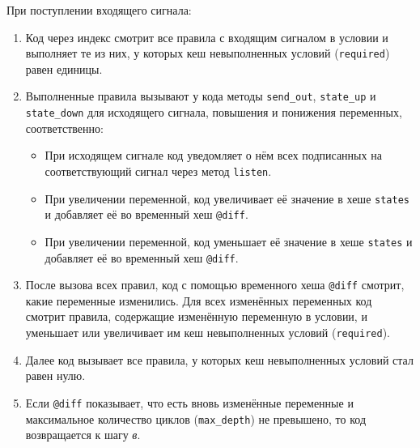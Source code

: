 \documentclass[utf8,a5paper,portrait,10pt]{eskdtext}
\begin{document}
При поступлении входящего сигнала:
\begin{enumerate}
  \item Код через индекс смотрит все правила с входящим сигналом в условии и
        выполняет те из них, у которых кеш невыполненных условий
        (\texttt{required}) равен единицы.
  \item Выполненные правила вызывают у кода методы \texttt{send\_out},
        \texttt{state\_up} и \texttt{state\_down} для исходящего сигнала,
        повышения и понижения переменных, соответственно:
        \begin{itemize}
          \item При исходящем сигнале код уведомляет о нём всех подписанных
                на соответствующий сигнал через метод \texttt{listen}.
          \item При увеличении переменной, код увеличивает её значение в хеше
                \texttt{states} и добавляет её во временный хеш \texttt{@diff}.
          \item При увеличении переменной, код уменьшает её значение в хеше
                \texttt{states} и добавляет её во временный хеш \texttt{@diff}.
        \end{itemize}
  \item После вызова всех правил, код с помощью временного хеша \texttt{@diff}
        смотрит, какие переменные изменились. Для всех изменённых переменных
        код смотрит правила, содержащие изменённую переменную в условии, и
        уменьшает или увеличивает им кеш невыполненных условий
        (\texttt{required}).
  \item Далее код вызывает все правила, у которых кеш невыполненных условий
        стал равен нулю.
  \item Если \texttt{@diff} показывает, что есть вновь изменённые переменные и
        максимальное количество циклов (\texttt{max\_depth}) не превышено, то
        код возвращается к шагу \textit{в}.
\end{enumerate}
\end{document}
